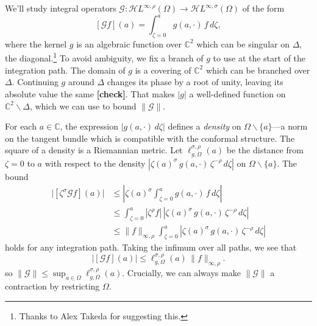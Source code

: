 \documentclass{article}
\theoremstyle{definition}
\newcommand{\maps}{\colon}
\newcommand{\C}{\mathbb{C}}
\newcommand{\holoL}[1]{\mathcal{H}L^{#1}} %
\begin{document}
We'll study integral operators $\mathcal{G} \maps \holoL{\infty, \rho}(\Omega) \to \holoL{\infty, \sigma}(\Omega)$ of the form
\[ [\mathcal{G}f](a) = \int_{\zeta = 0}^{a} g(a, \cdot)\,f\,d\zeta, \]
where the kernel $g$ is an algebraic function over $\C^2$ which can be singular on $\Delta$, the diagonal.\footnote{Thanks to Alex Takeda for suggesting this.} To avoid ambiguity, we fix a branch of $g$ to use at the start of the integration path. The domain of $g$ is a covering of $\C^2$ which can be branched over $\Delta$. Continuing $g$ around $\Delta$ changes its phase by a root of unity, leaving its absolute value the same \textbf{[check]}. That makes $|g|$ a well-defined function on $\C^2 \smallsetminus \Delta$, which we can use to bound $\|\mathcal{G}\|$.

For each $a \in \C$, the expression $|g(a, \cdot)\,d\zeta|$ defines a {\em density} on $\Omega \smallsetminus \{a\}$---a norm on the tangent bundle which is compatible with the conformal structure. The square of a density is a Riemannian metric. Let $\ell^{\sigma, \rho}_{g, \Omega}(a)$ be the distance from $\zeta = 0$ to $a$ with respect to the density $|\zeta(a)^\sigma\,g(a, \cdot)\,\zeta^{-\rho}\,d\zeta|$ on $\Omega \smallsetminus \{a\}$. The bound
\begin{align*}
\big|[\zeta^\sigma \mathcal{G}f](a)\big| & \le \left| \zeta(a)^\sigma \int_{\zeta = 0}^{a} g(a, \cdot)\,f\,d\zeta \right| \\
& \le \int_{\zeta = 0}^{a} |\zeta^\rho f|\,|\zeta(a)^\sigma\,g(a, \cdot)\,\zeta^{-\rho}\,d\zeta| \\
& \le \|f\|_{\infty, \rho} \int_{\zeta = 0}^{a} |\zeta(a)^\sigma\,g(a, \cdot)\,\zeta^{-\rho}\,d\zeta|
\end{align*}
holds for any integration path. Taking the infimum over all paths, we see that
\[ \big|[\mathcal{G}f](a)\big| \le \ell^{\sigma, \rho}_{g, \Omega}(a)\,\|f\|_{\infty, \rho}. \]
so $\|\mathcal{G}\| \le \sup_{a \in \Omega} \ell^{\sigma, \rho}_{g, \Omega}(a)$. Crucially, we can always make $\|\mathcal{G}\|$ a contraction by restricting $\Omega$.
\end{document}
